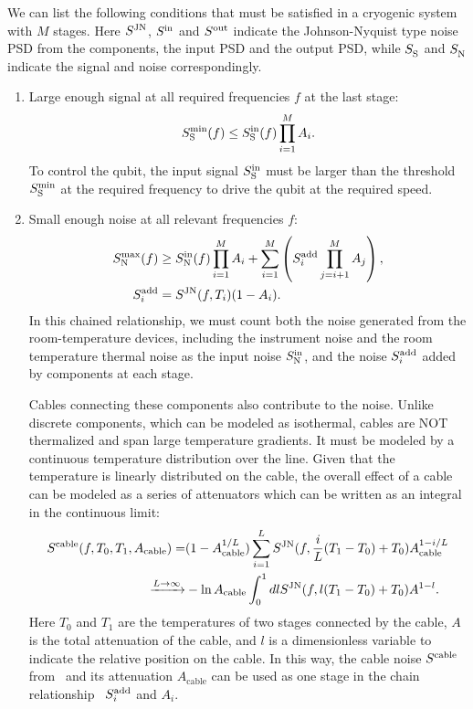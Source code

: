 \documentclass[a4paper,onecolumn,11pt,unpublished]{quantumarticle}
\newcommand{\Sin}{\Stm{in}{}}
\newcommand{\Sout}{\Stm{out}{}}
\newcommand{\SJN}{\Stm{JN}{}}
\newcommand{\Saddi}{\Stm{add}{i}}
\newcommand{\Acable}{A_{\mathrm{cable}}}
\begin{document}
We can list the following conditions that must be satisfied in a cryogenic system with $M$ stages. Here $\SJN$, $\Sin$ and $\Sout$ indicate the Johnson-Nyquist type noise PSD from the components, the input PSD and the output PSD, while $S^{\mathrm{}}_{\mathrm{S}}$ and $S^{\mathrm{}}_{\mathrm{N}}$ indicate the signal and noise correspondingly.
\begin{enumerate}
  \item Large enough signal at all required frequencies $f$ at the last stage:
        \begin{equation}
          S^{\mathrm{min}}_{\mathrm{S}}(f) \le S^{\mathrm{in}}_{\mathrm{S}}(f) \prod_{i=1}^{M}A_i . \label{eq:cryo_cond_1_signal}
        \end{equation}
        To control the qubit, the input signal $S^{\mathrm{in}}_{\mathrm{S}}$ must be larger than the threshold $S^{\mathrm{min}}_{\mathrm{S}}$ at the required frequency to drive the qubit at the required speed.
  \item Small enough noise at all relevant frequencies $f$:
        \begin{align}
          \Stt{max}{N}(f) & \ge \Stt{in}{N}(f)\prod_{i=1}^{M}A_i  + \sum_{i=1}^{M}\left(  \Saddi \prod_{j=i+1}^{M}A_j\right), \label{eq:cryo_cond_2_noise_chain} \\
          \Saddi          & = \SJN(f,T_i)(1-A_i). \label{eq:cryo_sadd}
        \end{align}
        In this chained relationship, we must count both the noise generated from the room-temperature devices, including the instrument noise and the room temperature thermal noise as the input noise $S^{\mathrm{in}}_{\mathrm{N}}$, and the noise  $\Saddi$ added by components at each stage.

        Cables connecting these components also contribute to the noise. Unlike discrete components, which can be modeled as isothermal, cables are NOT thermalized and span large temperature gradients. It must be modeled by a continuous temperature distribution over the line. Given that the temperature is linearly distributed on the cable, the overall effect of a cable can be modeled as a series of attenuators which can be written as an integral in the continuous limit:
        \begin{align}
          \Stt{cable}{}(f,T_0,T_1,\Acable) = & (1-\Acable^{1/L})\sum_{i=1}^{L} \SJN(f, \frac{i}{L} (T_1 - T_0) + T_0) \Acable^{1-i/L}            \\
          \xrightarrow{L\rightarrow\infty}   & -\ln \Acable \int_0^1 dl \SJN(f, l(T_1 - T_0) + T_0) A^{1-l}. \label{eq:cable_linear_attenuation}
        \end{align}
        Here $T_0$ and $T_1$ are the temperatures of two stages connected by the cable, $A$ is the total attenuation of the cable, and $l$ is a dimensionless variable to indicate the relative position on the cable. In this way, the cable noise $S^{\mathrm{cable}}_{\mathrm{}}$ from~ and its attenuation $\Acable$ can be used as one stage in the chain relationship~ $\Saddi$ and $A_i$.


\end{enumerate}
\end{document}
